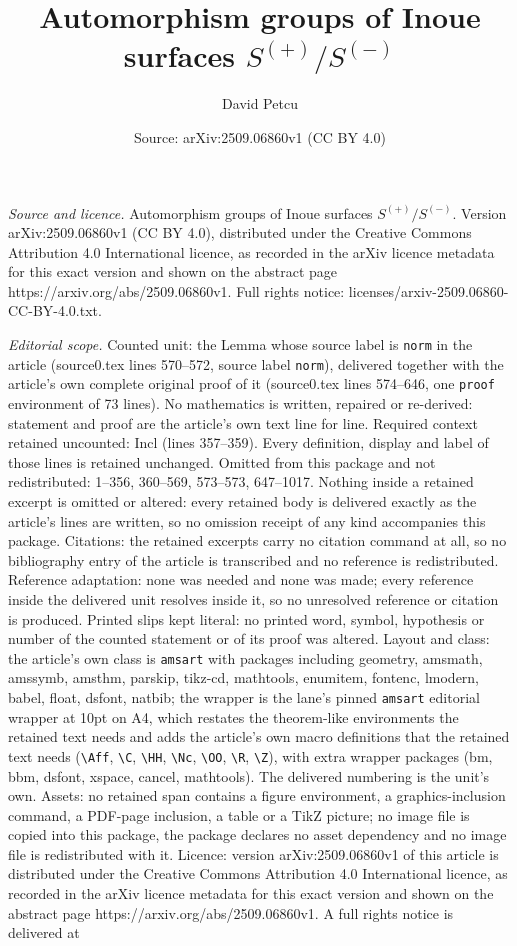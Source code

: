 \documentclass[10pt,a4paper]{amsart}
\title[Automorphism groups of Inoue surfaces $S^{(+)}/S^{(-)}$]{Automorphism groups of Inoue surfaces $S^{(+)}/S^{(-)}$}
\author{David Petcu}
\date{Source: arXiv:2509.06860v1 (CC BY 4.0)}
\begin{document}
\maketitle

\noindent\emph{Source and licence.} Automorphism groups of Inoue surfaces $S^{(+)}/S^{(-)}$. Version arXiv:2509.06860v1 (CC BY 4.0), distributed under the Creative Commons Attribution 4.0 International licence, as recorded in the arXiv licence metadata for this exact version and shown on the abstract page https://arxiv.org/abs/2509.06860v1. Full rights notice: licenses/arxiv-2509.06860-CC-BY-4.0.txt.\par\smallskip

\noindent\textit{Editorial scope.} Counted unit: the Lemma whose source label is \texttt{norm} in the article (source0.tex lines 570--572, source label \texttt{norm}), delivered together with the article's own complete original proof of it (source0.tex lines 574--646, one \texttt{proof} environment of 73 lines). No mathematics is written, repaired or re-derived: statement and proof are the article's own text line for line. Required context retained uncounted: Incl (lines 357--359). Every definition, display and label of those lines is retained unchanged. Omitted from this package and not redistributed: 1--356, 360--569, 573--573, 647--1017. Nothing inside a retained excerpt is omitted or altered: every retained body is delivered exactly as the article's lines are written, so no omission receipt of any kind accompanies this package. Citations: the retained excerpts carry no citation command at all, so no bibliography entry of the article is transcribed and no reference is redistributed. Reference adaptation: none was needed and none was made; every reference inside the delivered unit resolves inside it, so no unresolved reference or citation is produced. Printed slips kept literal: no printed word, symbol, hypothesis or number of the counted statement or of its proof was altered. Layout and class: the article's own class is \texttt{amsart} with packages including geometry, amsmath, amssymb, amsthm, parskip, tikz-cd, mathtools, enumitem, fontenc, lmodern, babel, float, dsfont, natbib; the wrapper is the lane's pinned \texttt{amsart} editorial wrapper at 10pt on A4, which restates the theorem-like environments the retained text needs and adds the article's own macro definitions that the retained text needs (\texttt{\textbackslash Aff}, \texttt{\textbackslash C}, \texttt{\textbackslash HH}, \texttt{\textbackslash Nc}, \texttt{\textbackslash OO}, \texttt{\textbackslash R}, \texttt{\textbackslash Z}), with extra wrapper packages (bm, bbm, dsfont, xspace, cancel, mathtools). The delivered numbering is the unit's own. Assets: no retained span contains a figure environment, a graphics-inclusion command, a PDF-page inclusion, a table or a TikZ picture; no image file is copied into this package, the package declares no asset dependency and no image file is redistributed with it. Licence: version arXiv:2509.06860v1 of this article is distributed under the Creative Commons Attribution 4.0 International licence, as recorded in the arXiv licence metadata for this exact version and shown on the abstract page https://arxiv.org/abs/2509.06860v1. A full rights notice is delivered at 
\end{document}
